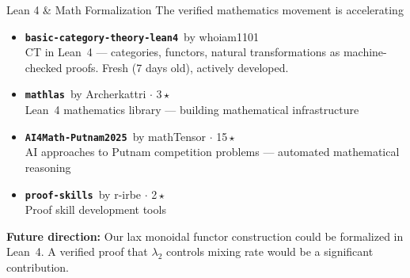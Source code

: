 \documentclass[aspectratio=169,14pt]{beamer}
\newcommand{\repo}[2]{\texttt{\color{geccoAccent}\bfseries #1}{\color{dimGray}\scriptsize\ by #2}}
\newcommand{\repoHL}[2]{\texttt{\color{geccoHighlight}\bfseries #1}{\color{dimGray}\scriptsize\ by #2}}
\newcommand{\repoGR}[2]{\texttt{\color{geccoGreen}\bfseries #1}{\color{dimGray}\scriptsize\ by #2}}
\newcommand{\bscore}[1]{{\color{geccoAccent}\bfseries #1}}
\begin{document}
\begin{frame}{Lean 4 \& Math Formalization}
  {\small\color{dimGray} The verified mathematics movement is accelerating}
  \vspace{8pt}

  \begin{itemize}
    \item[\bscore{0.20}] \repoGR{basic-category-theory-lean4}{whoiam1101}\\
      {\small CT in Lean~4 --- categories, functors, natural transformations as machine-checked proofs. Fresh (7 days old), actively developed.}
    \vspace{6pt}
    \item[\bscore{0.20}] \repo{mathlas}{Archerkattri} {\small$\cdot$ 3\,\(\star\)}\\
      {\small Lean~4 mathematics library --- building mathematical infrastructure}
    \vspace{6pt}
    \item[] \repoHL{AI4Math-Putnam2025}{mathTensor} {\small$\cdot$ 15\,\(\star\)}\\
      {\small AI approaches to Putnam competition problems --- automated mathematical reasoning}
    \vspace{6pt}
    \item[] \repo{proof-skills}{r-irbe} {\small$\cdot$ 2\,\(\star\)}\\
      {\small Proof skill development tools}
  \end{itemize}

  \vspace{6pt}
  {\small\color{geccoHighlight}\textbf{Future direction:} \color{white}Our lax monoidal functor construction could be formalized in Lean~4. A verified proof that $\lambda_2$ controls mixing rate would be a significant contribution.}
\end{frame}
\end{document}
